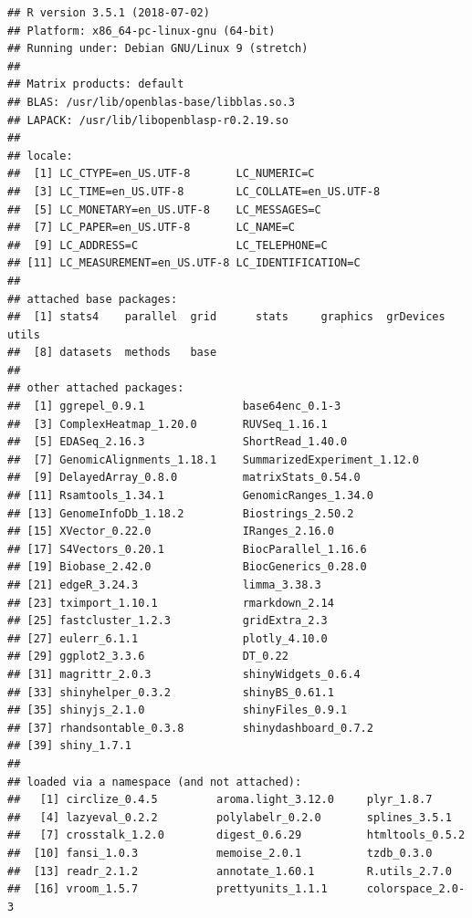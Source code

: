 \documentclass[]{article}
\begin{document}
\begin{verbatim}
## R version 3.5.1 (2018-07-02)
## Platform: x86_64-pc-linux-gnu (64-bit)
## Running under: Debian GNU/Linux 9 (stretch)
## 
## Matrix products: default
## BLAS: /usr/lib/openblas-base/libblas.so.3
## LAPACK: /usr/lib/libopenblasp-r0.2.19.so
## 
## locale:
##  [1] LC_CTYPE=en_US.UTF-8       LC_NUMERIC=C              
##  [3] LC_TIME=en_US.UTF-8        LC_COLLATE=en_US.UTF-8    
##  [5] LC_MONETARY=en_US.UTF-8    LC_MESSAGES=C             
##  [7] LC_PAPER=en_US.UTF-8       LC_NAME=C                 
##  [9] LC_ADDRESS=C               LC_TELEPHONE=C            
## [11] LC_MEASUREMENT=en_US.UTF-8 LC_IDENTIFICATION=C       
## 
## attached base packages:
##  [1] stats4    parallel  grid      stats     graphics  grDevices utils    
##  [8] datasets  methods   base     
## 
## other attached packages:
##  [1] ggrepel_0.9.1               base64enc_0.1-3            
##  [3] ComplexHeatmap_1.20.0       RUVSeq_1.16.1              
##  [5] EDASeq_2.16.3               ShortRead_1.40.0           
##  [7] GenomicAlignments_1.18.1    SummarizedExperiment_1.12.0
##  [9] DelayedArray_0.8.0          matrixStats_0.54.0         
## [11] Rsamtools_1.34.1            GenomicRanges_1.34.0       
## [13] GenomeInfoDb_1.18.2         Biostrings_2.50.2          
## [15] XVector_0.22.0              IRanges_2.16.0             
## [17] S4Vectors_0.20.1            BiocParallel_1.16.6        
## [19] Biobase_2.42.0              BiocGenerics_0.28.0        
## [21] edgeR_3.24.3                limma_3.38.3               
## [23] tximport_1.10.1             rmarkdown_2.14             
## [25] fastcluster_1.2.3           gridExtra_2.3              
## [27] eulerr_6.1.1                plotly_4.10.0              
## [29] ggplot2_3.3.6               DT_0.22                    
## [31] magrittr_2.0.3              shinyWidgets_0.6.4         
## [33] shinyhelper_0.3.2           shinyBS_0.61.1             
## [35] shinyjs_2.1.0               shinyFiles_0.9.1           
## [37] rhandsontable_0.3.8         shinydashboard_0.7.2       
## [39] shiny_1.7.1                
## 
## loaded via a namespace (and not attached):
##   [1] circlize_0.4.5         aroma.light_3.12.0     plyr_1.8.7            
##   [4] lazyeval_0.2.2         polylabelr_0.2.0       splines_3.5.1         
##   [7] crosstalk_1.2.0        digest_0.6.29          htmltools_0.5.2       
##  [10] fansi_1.0.3            memoise_2.0.1          tzdb_0.3.0            
##  [13] readr_2.1.2            annotate_1.60.1        R.utils_2.7.0         
##  [16] vroom_1.5.7            prettyunits_1.1.1      colorspace_2.0-3      

\end{verbatim}
\end{document}
